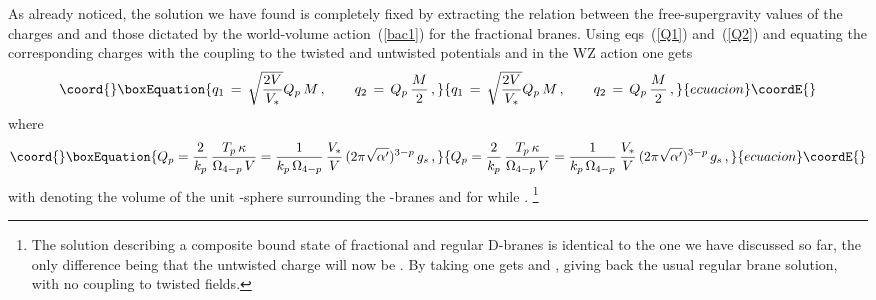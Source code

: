 \documentclass[a4paper,11pt]{article}
\providecommand{\eqref}[1]{(\ref{#1})}
\begin{document}
As already noticed, the solution we have found is completely fixed by
extracting the relation between the free-supergravity values of the
charges \coordHE{} and \coordHE{} and those dictated by the world-volume
action~\eqref{bac1} for the \coordHE{} fractional branes. Using eqs~\eqref{Q1}
and~\eqref{Q2} and equating the corresponding charges with the coupling
to the twisted and untwisted potentials \coordHE{} and
\coordHE{}  in the WZ action one gets
\begin{equation}\coord{}\boxEquation{
\label{q1q2}
q_1 \,=\, \sqrt{\frac{2 V}{V_*}} Q_p\,M \spa q_2 \,=\, Q_p\,
\frac{M}{2} \,,
}{
q_1 \,=\, \sqrt{\frac{2 V}{V_*}} Q_p\,M \spa q_2 \,=\, Q_p\,
\frac{M}{2} \,,
}{ecuacion}\coordE{}\end{equation}
where
\begin{equation}\coord{}\boxEquation{
\label{def1}
Q_p = \frac{2}{k_p}\,\frac{T_p \,\kappa}{\Omega_{4-p}\,V} = 
  \frac{1}{k_p\,\Omega_{4-p}}\,\frac{V_*}{V}\,(2\pi\sqrt{\alpha'})^{3-p}\,g_s
  \,,
}{
Q_p = \frac{2}{k_p}\,\frac{T_p \,\kappa}{\Omega_{4-p}\,V} = 
  \frac{1}{k_p\,\Omega_{4-p}}\,\frac{V_*}{V}\,(2\pi\sqrt{\alpha'})^{3-p}\,g_s
  \,,
}{ecuacion}\coordE{}\end{equation}
with \coordHE{} denoting the volume of the unit \coordHE{}-sphere
surrounding the \coordHE{}-branes and \coordHE{} for \coordHE{} while \coordHE{}.%
\footnote{The solution describing a composite bound state of \coordHE{}
fractional and \coordHE{} regular D\coordHE{}-branes is identical to the one we have
discussed so far, the only difference being that the untwisted charge
\coordHE{} will now be \coordHE{}. By taking \coordHE{} one
gets \coordHE{} and \coordHE{}, giving back the usual regular brane
solution, with no coupling to twisted fields.}
\end{document}
